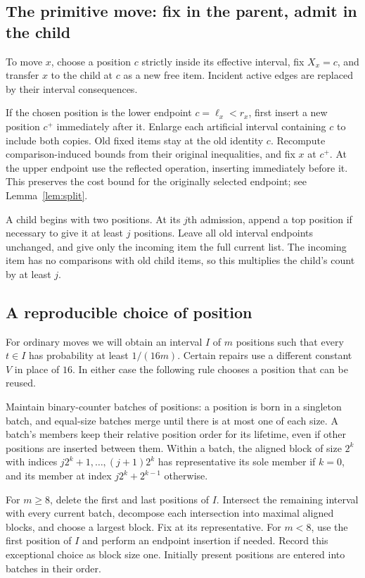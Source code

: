 \subsection{The primitive move: fix in the parent, admit in the child}
\label{sec:move}

To move $x$, choose a position $c$ strictly inside its effective interval,
fix $X_x=c$, and transfer $x$ to the child at $c$ as a new free item.
Incident active edges are replaced by their interval consequences.

If the chosen position is the lower endpoint $c=\ell_x<r_x$, first insert a
new position $c^+$ immediately after it. Enlarge each artificial interval
containing $c$ to include both copies. Old fixed items stay at the old
identity $c$. Recompute comparison-induced bounds from their original
inequalities, and fix $x$ at $c^+$. At the upper endpoint use the reflected
operation, inserting immediately before it. This preserves the cost bound
for the originally selected endpoint; see Lemma~\ref{lem:split}.

A child begins with two positions. At its $j$th admission, append a top
position if necessary to give it at least $j$ positions. Leave all old
interval endpoints unchanged, and give only the incoming item the full
current list. The incoming item has no comparisons with old child items, so
this multiplies the child's count by at least $j$.

\subsection{A reproducible choice of position}
\label{sec:representatives}

For ordinary moves we will obtain an interval $I$ of $m$ positions such that
every $t\in I$ has probability at least $1/(16m)$. Certain repairs use a
different constant $V$ in place of $16$. In either case the following rule
chooses a position that can be reused.

Maintain binary-counter batches of positions: a position is born in a
singleton batch, and equal-size batches merge until there is at most one of
each size. A batch's members keep their relative position order for its
lifetime, even if other positions are inserted between them.
Within a batch, the aligned block of size $2^k$ with indices
$j2^k+1,\ldots,(j+1)2^k$ has representative its sole member if $k=0$,
and its member at index $j2^k+2^{k-1}$ otherwise.

For $m\geq8$, delete the first and last positions of $I$. Intersect the
remaining interval with every current batch, decompose each intersection
into maximal aligned blocks, and choose a largest block. Fix at its
representative. For $m<8$, use the first position of $I$ and perform an
endpoint insertion if needed. Record this exceptional choice as block size
one. Initially present positions are entered into batches in their order.

